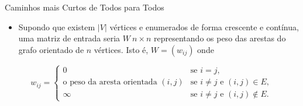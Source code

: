 \documentclass{beamer}
\begin{document}
	
	\begin{frame}{Caminhos mais Curtos de Todos para Todos}
		\begin{itemize}
			\item Supondo que existem $|V|$ vértices e enumerados de forma crescente e contínua, uma matriz de entrada seria $W\ n \times n$ representando os peso das arestas do grafo orientado de $n$ vértices. Isto é, $W = (w_{ij})$ onde 
		\end{itemize}
		
		$$
		w_{ij} = 
		\begin{cases}
		0 & \mbox{se } i = j, \\
		\mbox{o peso da aresta orientada } (i, j) & \mbox{se } i \neq j \mbox{ e } (i, j) \in E, \\
		\infty & \mbox{se } i \neq j \mbox{ e } (i, j) \notin E.
		\end{cases}
		$$
		
	\end{frame}
\end{document}
